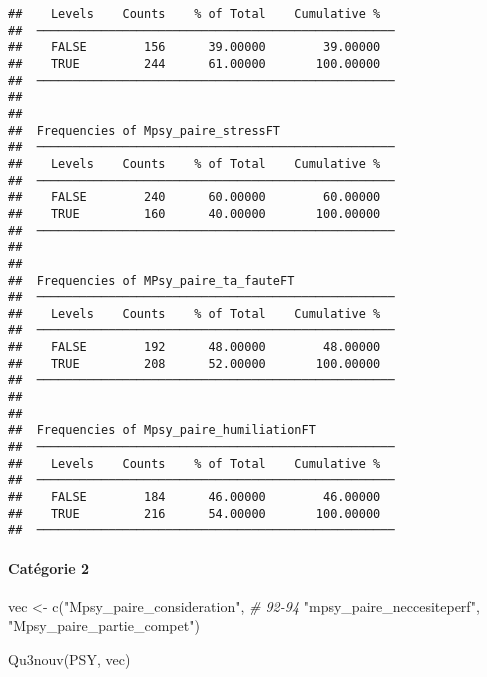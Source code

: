 \documentclass[
]{article}
\newenvironment{Shaded}{\begin{snugshade}}{\end{snugshade}}
\newcommand{\CommentTok}[1]{\textcolor[rgb]{0.56,0.35,0.01}{\textit{#1}}}
\newcommand{\FunctionTok}[1]{\textcolor[rgb]{0.00,0.00,0.00}{#1}}
\newcommand{\NormalTok}[1]{#1}
\newcommand{\OtherTok}[1]{\textcolor[rgb]{0.56,0.35,0.01}{#1}}
\newcommand{\StringTok}[1]{\textcolor[rgb]{0.31,0.60,0.02}{#1}}
\begin{document}
\begin{verbatim}
##    Levels    Counts    % of Total    Cumulative %   
##  ────────────────────────────────────────────────── 
##    FALSE        156      39.00000        39.00000   
##    TRUE         244      61.00000       100.00000   
##  ────────────────────────────────────────────────── 
## 
## 
##  Frequencies of Mpsy_paire_stressFT                 
##  ────────────────────────────────────────────────── 
##    Levels    Counts    % of Total    Cumulative %   
##  ────────────────────────────────────────────────── 
##    FALSE        240      60.00000        60.00000   
##    TRUE         160      40.00000       100.00000   
##  ────────────────────────────────────────────────── 
## 
## 
##  Frequencies of MPsy_paire_ta_fauteFT               
##  ────────────────────────────────────────────────── 
##    Levels    Counts    % of Total    Cumulative %   
##  ────────────────────────────────────────────────── 
##    FALSE        192      48.00000        48.00000   
##    TRUE         208      52.00000       100.00000   
##  ────────────────────────────────────────────────── 
## 
## 
##  Frequencies of Mpsy_paire_humiliationFT            
##  ────────────────────────────────────────────────── 
##    Levels    Counts    % of Total    Cumulative %   
##  ────────────────────────────────────────────────── 
##    FALSE        184      46.00000        46.00000   
##    TRUE         216      54.00000       100.00000   
##  ──────────────────────────────────────────────────
\end{verbatim}

\hypertarget{catuxe9gorie-2}{%
\paragraph{Catégorie 2}\label{catuxe9gorie-2}}

\begin{Shaded}
\begin{Highlighting}[]
\NormalTok{vec }\OtherTok{\textless{}{-}} \FunctionTok{c}\NormalTok{(}\StringTok{"Mpsy\_paire\_consideration"}\NormalTok{,  }\CommentTok{\# 92{-}94}
    \StringTok{"mpsy\_paire\_neccesiteperf"}\NormalTok{,}
    \StringTok{"Mpsy\_paire\_partie\_compet"}\NormalTok{)}

\FunctionTok{Qu3nouv}\NormalTok{(PSY, vec)}
\end{Highlighting}
\end{Shaded}
\end{document}
